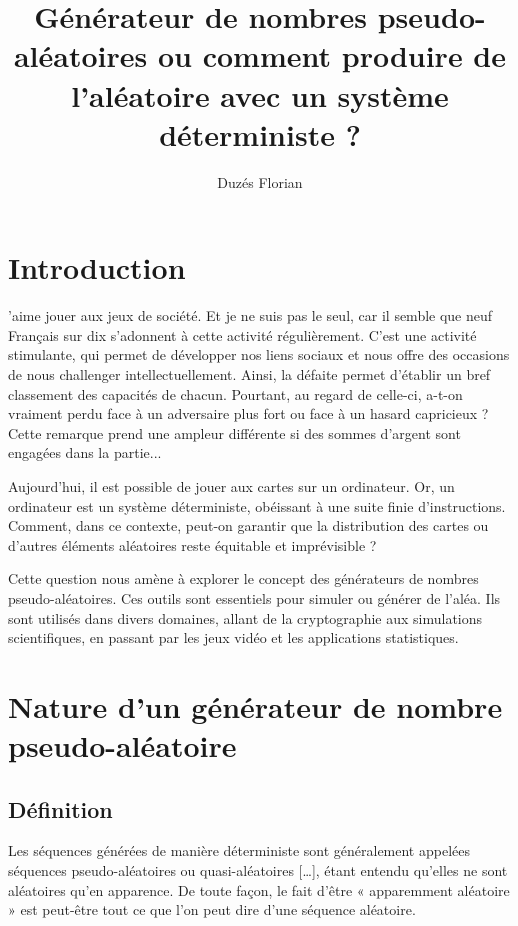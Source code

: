 \documentclass[9pt,a4paper,twoside,english]{class/backend}
\title{Générateur de nombres pseudo-aléatoires ou comment produire de l'aléatoire avec un système déterministe ?}
\author[1]{Duzés Florian}
\affil[1]{Étudiant de master Cryptologie et Sécurité Informatique}
\begin{document}
	
    \maketitle
    \thispagestyle{firststyle}
    \linenumbers


\section{Introduction}

    'aime jouer aux jeux de société. Et je ne suis pas le seul, car il semble que neuf Français sur dix \cite{jeuxSociete} s'adonnent à cette activité régulièrement. C'est une activité stimulante, qui permet de développer nos liens sociaux et nous offre des occasions de nous challenger intellectuellement. Ainsi, la défaite permet d'établir un bref classement des capacités de chacun. Pourtant, au regard de celle-ci, a-t-on vraiment perdu face à un adversaire plus fort ou face à un hasard capricieux ? Cette remarque prend une ampleur différente si des sommes d'argent sont engagées dans la partie... 

    Aujourd'hui, il est possible de jouer aux cartes sur un ordinateur. Or, un ordinateur est un système déterministe, obéissant à une suite finie d'instructions. Comment, dans ce contexte, peut-on garantir que la distribution des cartes ou d'autres éléments aléatoires reste équitable et imprévisible ?

    Cette question nous amène à explorer le concept des générateurs de nombres pseudo-aléatoires. Ces outils sont essentiels pour simuler ou générer de l'aléa. Ils sont utilisés dans divers domaines, allant de la cryptographie aux simulations scientifiques, en passant par les jeux vidéo et les applications statistiques.

\section{Nature d'un générateur de nombre pseudo-aléatoire}

    \subsection{Définition}
        \begin{rhoenv}[frametitle={Donald E.Knuth, \citetitle{RefGen}}]
        Les séquences générées de manière déterministe sont généralement appelées séquences pseudo-aléatoires ou quasi-aléatoires [\dots], étant entendu qu'elles ne sont aléatoires qu'en apparence. De toute façon, le fait d'être « apparemment aléatoire » est peut-être tout ce que l'on peut dire d'une séquence aléatoire.
        \end{rhoenv}
\end{document}
